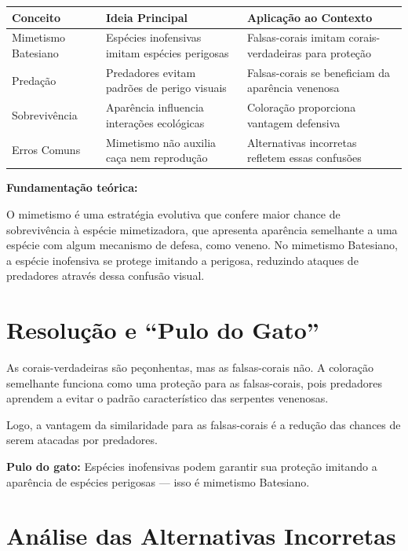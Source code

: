 \documentclass{article}
\begin{document}
\begin{tabular}{|p{4cm}|p{6cm}|p{5cm}|}
  \hline
  \textbf{Conceito} & \textbf{Ideia Principal} & \textbf{Aplicação ao Contexto} \\
  \hline
  Mimetismo Batesiano & Espécies inofensivas imitam espécies perigosas & Falsas-corais imitam corais-verdadeiras para proteção \\
  \hline
  Predação & Predadores evitam padrões de perigo visuais & Falsas-corais se beneficiam da aparência venenosa \\
  \hline
  Sobrevivência & Aparência influencia interações ecológicas & Coloração proporciona vantagem defensiva \\
  \hline
  Erros Comuns & Mimetismo não auxilia caça nem reprodução & Alternativas incorretas refletem essas confusões \\
  \hline
\end{tabular}

\bigskip

\textbf{Fundamentação teórica:}

O mimetismo é uma estratégia evolutiva que confere maior chance de sobrevivência à espécie mimetizadora, que apresenta aparência semelhante a uma espécie com algum mecanismo de defesa, como veneno. No mimetismo Batesiano, a espécie inofensiva se protege imitando a perigosa, reduzindo ataques de predadores através dessa confusão visual.

\section*{Resolução e ``Pulo do Gato''}

As corais-verdadeiras são peçonhentas, mas as falsas-corais não. A coloração semelhante funciona como uma proteção para as falsas-corais, pois predadores aprendem a evitar o padrão característico das serpentes venenosas.

Logo, a vantagem da similaridade para as falsas-corais é a redução das chances de serem atacadas por predadores.

\medskip

\textbf{Pulo do gato:} Espécies inofensivas podem garantir sua proteção imitando a aparência de espécies perigosas — isso é mimetismo Batesiano.

\section*{Análise das Alternativas Incorretas}
\end{document}

